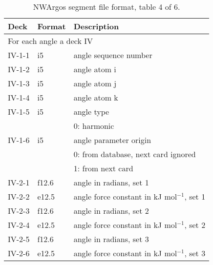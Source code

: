 \begin{table}
\center

\label{tbl:nwaseg4}

\begin{tabular*}{150mm}{p{12mm}p{12mm}l}
\hline\hline
Deck & Format & Description \\ \hline
\multicolumn{3}{l}{For each angle a deck IV} \\
IV-1-1 & i5     & angle sequence number \\
IV-1-2 & i5     & angle atom i \\
IV-1-3 & i5     & angle atom j \\
IV-1-4 & i5     & angle atom k \\
IV-1-5 & i5     & angle type \\
       &        & 0: harmonic\\
IV-1-6 & i5     & angle parameter origin\\
       &        & 0: from database, next card ignored \\
       &        & 1: from next card\\
IV-2-1 & f12.6  & angle in radians, set 1\\
IV-2-2 & e12.5  & angle force constant in kJ mol$^{-1}$, set 1 \\
IV-2-3 & f12.6  & angle in radians, set 2\\
IV-2-4 & e12.5  & angle force constant in kJ mol$^{-1}$, set 2 \\
IV-2-5 & f12.6  & angle in radians, set 3\\
IV-2-6 & e12.5  & angle force constant in kJ mol$^{-1}$, set 3 \\
\hline
\end{tabular*}

\caption{NWArgos segment file format, table 4 of 6.}

\end{table}

